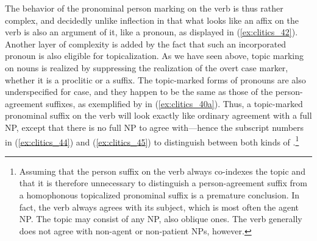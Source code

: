 The behavior of the pronominal person marking on the verb is thus rather
complex, and decidedly unlike inflection in that what looks like an affix on
the verb is also an argument of it, like a pronoun, as displayed in
(\ref{ex:clitics_42}). Another layer of complexity is added by the fact that
such an incorporated pronoun is also eligible for topicalization. As we have
seen above, topic marking on nouns is realized by suppressing the realization
of the overt case marker, whether it is a proclitic or a suffix. The
topic-marked forms of pronouns are also underspecified for case, and they
happen to be the same as those of the person-agreement suffixes, as exemplified
by  in (\ref{ex:clitics_40a}). Thus, a topic-marked pronominal
suffix on the verb will look exactly like ordinary agreement with a full NP,
except that there is no full NP to agree with---hence the subscript numbers in
(\ref{ex:clitics_44}) and (\ref{ex:clitics_45}) to distinguish between both
kinds of .\footnote{Assuming that the person suffix on the verb
always co-indexes the topic and that it is therefore unnecessary to distinguish
a person-agreement suffix from a homophonous topicalized pronominal suffix is a
premature conclusion. In fact, the verb always agrees with its subject, which
is most often the agent NP. The topic may consist of any NP, also oblique ones.
The verb generally does not agree with non-agent or non-patient NPs, however.}

